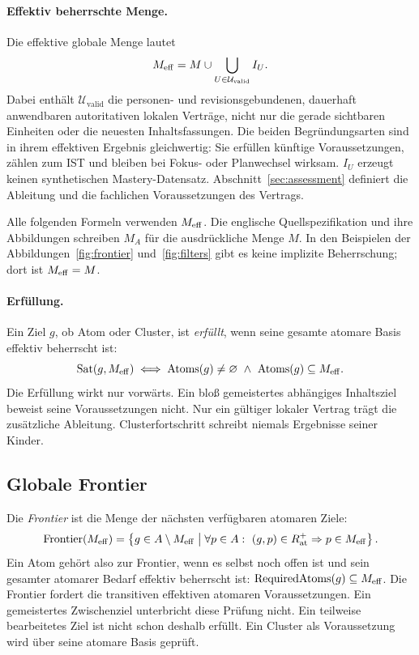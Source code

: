 \paragraph{Effektiv beherrschte Menge.}
Die effektive globale Menge lautet
\[
 M_{\mathrm{eff}}=M\cup\bigcup_{U\in\mathcal U_{\mathrm{valid}}}I_U.
\]
Dabei enthält $\mathcal U_{\mathrm{valid}}$ die personen- und
revisionsgebundenen, dauerhaft anwendbaren autoritativen lokalen Verträge,
nicht nur die gerade sichtbaren Einheiten oder die neuesten Inhaltsfassungen.
Die beiden Begründungsarten sind in ihrem effektiven Ergebnis gleichwertig:
Sie erfüllen künftige Voraussetzungen, zählen zum IST und bleiben bei
Fokus- oder Planwechsel wirksam. $I_U$ erzeugt keinen synthetischen
Mastery-Datensatz. Abschnitt~\ref{sec:assessment} definiert die Ableitung
und die fachlichen Voraussetzungen des Vertrags.

Alle folgenden Formeln verwenden $M_{\mathrm{eff}}$. Die englische Quellspezifikation
und ihre Abbildungen schreiben $M_A$ für die ausdrückliche Menge $M$. In
den Beispielen der Abbildungen~\ref{fig:frontier} und~\ref{fig:filters}
gibt es keine implizite Beherrschung; dort ist $M_{\mathrm{eff}}=M$.

\paragraph{Erfüllung.}
Ein Ziel $g$, ob Atom oder Cluster, ist \emph{erfüllt}, wenn seine gesamte
atomare Basis effektiv beherrscht ist:
\begin{equation}
 \operatorname{Sat}(g,M_{\mathrm{eff}})\iff
 \operatorname{Atoms}(g)\ne\varnothing\ \land\ \operatorname{Atoms}(g)\subseteq M_{\mathrm{eff}}.
 \label{eq:sat}
\end{equation}
Die Erfüllung wirkt nur vorwärts. Ein bloß gemeistertes abhängiges
Inhaltsziel beweist seine Voraussetzungen nicht. Nur ein gültiger lokaler
Vertrag trägt die zusätzliche Ableitung. Clusterfortschritt schreibt
niemals Ergebnisse seiner Kinder.

\subsection{Globale Frontier}
Die \emph{Frontier} ist die Menge der nächsten verfügbaren atomaren Ziele:
\begin{equation}
 \operatorname{Frontier}(M_{\mathrm{eff}})=\left\{g\in A\setminus M_{\mathrm{eff}}\;\middle|\;
 \forall p\in A:\ (g,p)\in R_{\mathrm{at}}^+\Rightarrow p\in M_{\mathrm{eff}}\right\}.
 \label{eq:frontier}
\end{equation}
Ein Atom gehört also zur Frontier, wenn es selbst noch offen ist und sein
gesamter atomarer Bedarf effektiv beherrscht ist:
$\operatorname{RequiredAtoms}(g)\subseteq M_{\mathrm{eff}}$.
Die Frontier fordert die transitiven effektiven atomaren Voraussetzungen.
Ein gemeistertes Zwischenziel unterbricht diese Prüfung nicht. Ein teilweise
bearbeitetes Ziel ist nicht schon deshalb erfüllt. Ein Cluster als
Voraussetzung wird über seine atomare Basis geprüft.

